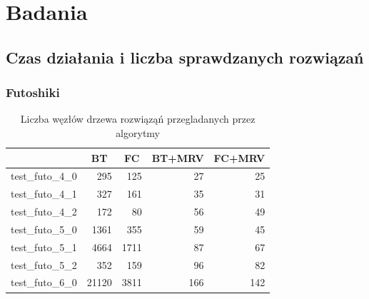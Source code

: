 \documentclass{article}
\begin{document}
	\section{Badania}
	\subsection{Czas działania i liczba sprawdzanych rozwiązań}
	\subsubsection{Futoshiki}
	
	\begin{table}[H]
		\caption{Liczba węzłów drzewa rozwiąząń przegladanych przez algorytmy}
		\label{tab:solutions_futo}
		\begin{center}
			\begin{tabular}{|l|r|r|r|r|}
				\hline
				& \multicolumn{1}{c|}{\textbf{BT}} & \multicolumn{1}{c|}{\textbf{FC}} & \multicolumn{1}{c|}{\textbf{BT+MRV}} & \multicolumn{1}{c|}{\textbf{FC+MRV}} \\ \hline
				test\_futo\_4\_0 & 295                              & 125                              & 27                                   & 25                                   \\ \hline
				test\_futo\_4\_1 & 327                              & 161                              & 35                                   & 31                                   \\ \hline
				test\_futo\_4\_2 & 172                              & 80                               & 56                                   & 49                                   \\ \hline
				test\_futo\_5\_0 & 1361                             & 355                              & 59                                   & 45                                   \\ \hline
				test\_futo\_5\_1 & 4664                             & 1711                             & 87                                   & 67                                   \\ \hline
				test\_futo\_5\_2 & 352                              & 159                              & 96                                   & 82                                   \\ \hline
				test\_futo\_6\_0 & 21120                            & 3811                             & 166                                  & 142                                  \\ \hline

\end{tabular}
\end{center}
\end{table}
\end{document}
